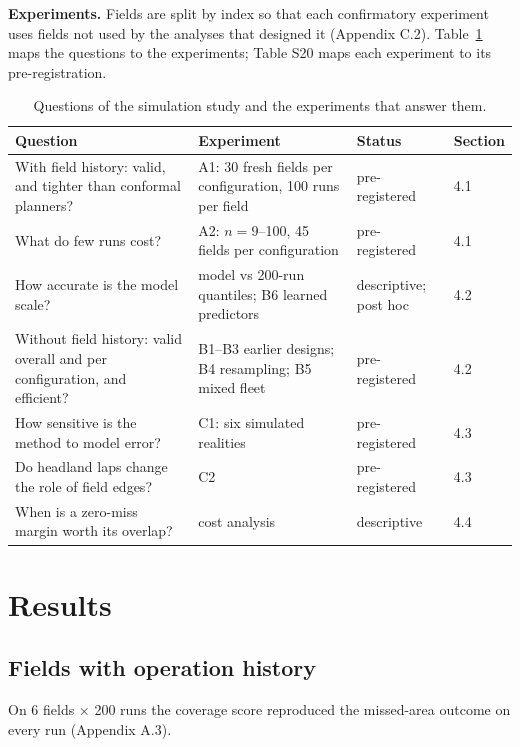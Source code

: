 \documentclass[preprint,12pt,authoryear]{elsarticle}
\begin{document}
\textbf{Experiments.} Fields are split by index so that each confirmatory experiment uses fields not used by the analyses that designed it (Appendix C.2). Table~\ref{tab:5} maps the questions to the experiments; Table S20 maps each experiment to its pre-registration.

\begin{table}[!htbp]
\centering
\footnotesize
\caption{Questions of the simulation study and the experiments that answer them.}\label{tab:5}
\begin{tabularx}{\textwidth}{@{}>{\raggedright\arraybackslash\hsize=1.00\hsize}X>{\raggedright\arraybackslash\hsize=1.00\hsize}Xll@{}}
\toprule
\textbf{Question} & \textbf{Experiment} & \textbf{Status} & \textbf{Section} \\
\midrule
With field history: valid, and tighter than conformal planners? & A1: 30 fresh fields per configuration, 100 runs per field & pre-registered & 4.1 \\
What do few runs cost? & A2: \(n=9\)--100, 45 fields per configuration & pre-registered & 4.1 \\
How accurate is the model scale? & model vs 200-run quantiles; B6 learned predictors & descriptive; post hoc & 4.2 \\
Without field history: valid overall and per configuration, and efficient? & B1--B3 earlier designs; B4 resampling; B5 mixed fleet & pre-registered & 4.2 \\
How sensitive is the method to model error? & C1: six simulated realities & pre-registered & 4.3 \\
Do headland laps change the role of field edges? & C2 & pre-registered & 4.3 \\
When is a zero-miss margin worth its overlap? & cost analysis & descriptive & 4.4 \\
\bottomrule
\end{tabularx}
\end{table}

\section{Results}

\subsection{Fields with operation history}

On 6 fields × 200 runs the coverage score reproduced the missed-area outcome on every run (Appendix A.3).
\end{document}
